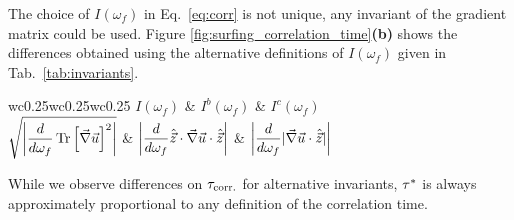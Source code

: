The choice of $I(\omega_f)$ in Eq.~\eqref{eq:corr} is not unique, any invariant of the gradient matrix could be used.
Figure \ref{fig:surfing_correlation_time}\textbf{(b)} shows the differences obtained using the alternative definitions of $I(\omega_f)$ given in Tab.~\ref{tab:invariants}.
\begin{table}
	\center
	\begin{tabular}{w{c}{0.25\linewidth}w{c}{0.25\linewidth}w{c}{0.25\linewidth}}
		$I(\omega_f)$ & $I^b(\omega_f)$ & $I^c(\omega_f)$ \\
		$\displaystyle \sqrt{ \abs*{ \frac{d}{d\omega_f} \tr \left[ \Gradients \right]^2 } }$ & $\displaystyle \abs*{ \frac{d}{d\omega_f} \Direction \cdot \Gradients \cdot \Direction}$ & $\displaystyle \abs*{ \frac{d}{d\omega_f} \norm {\Gradients \cdot \Direction} }$ \\
	\end{tabular}
	\caption{Various possible definitions of $I(\omega_f)$ based on different invariants of the flow velocity gradients.}
	\label{tab:invariants}
\end{table}
While we observe differences on $\CorrelationTime$ for alternative invariants, $\TimeHorizonOpt$ is always approximately proportional to any definition of the correlation time.

